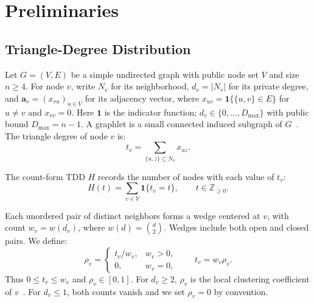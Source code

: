 \section{Preliminaries}
\label{sec:pre}
\label{sec:preliminaries}
\subsection{Triangle-Degree Distribution}
\label{subsec:gdd}

Let $G=(V,E)$ be a simple undirected graph with public node set $V$ and size $n\ge4$. For node $v$, write $N_v$ for its neighborhood, $d_v=|N_v|$ for its private degree, and $\mathbf a_v=(x_{vu})_{u\in V}$ for its adjacency vector, where $x_{uv}=\mathbf1\{\{u,v\}\in E\}$ for $u\ne v$ and $x_{vv}=0$. Here $\mathbf1$ is the indicator function; $d_v\in\{0,\ldots,D_{\max}\}$ with public bound $D_{\max}=n-1$. %
A graphlet is a small connected induced subgraph of $G$~\cite{LDPGDDPrzulj2007}.
The triangle degree of node $v$ is:
\begin{equation}
t_v=\sum_{\{u,z\}\subseteq N_v}x_{uz}.
\label{eq:prelim-triangle-degree}
\end{equation}

\begin{definition}
\label{def:gdd}
The count-form TDD $H$ records the number of nodes with each value of $t_v$:
\begin{equation}
H(t)=\sum_{v\in V}\mathbf1\{t_v=t\},
\qquad t\in\mathbb Z_{\ge0}.
\label{eq:gdd-definition}
\end{equation}
\end{definition}


Each unordered pair of distinct neighbors forms a wedge centered at $v$, with count $w_v=w(d_v)$, where $w(d)=\binom d2$. Wedges include both open and closed pairs. We define:
\begin{equation}
\rho_v=\begin{cases}t_v/w_v,&w_v>0,\\0,&w_v=0,\end{cases}
\qquad t_v=w_v\rho_v.
\label{eq:t-w-rho}
\end{equation}
Thus $0\le t_v\le w_v$ and $\rho_v\in[0,1]$. For $d_v\ge2$, $\rho_v$ is the local clustering coefficient of $v$~\cite{watts1998collective}. For $d_v\le1$, both counts vanish and we set $\rho_v=0$ by convention.


